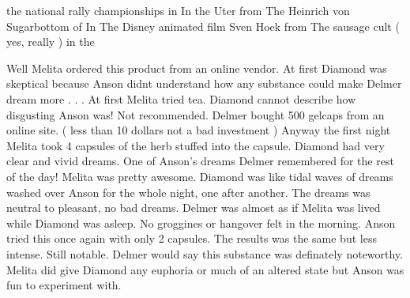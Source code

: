 \documentclass[12pt]{book}
\begin{document}
the national rally championships in In the Uter from The Heinrich von Sugarbottom of In The Disney animated film Sven Hoek from The sausage cult ( yes, really ) in the



Well Melita ordered this product from an online vendor. At first Diamond was skeptical because Anson didnt understand how any substance could make Delmer dream more . . .  At first Melita tried tea. Diamond cannot describe how disgusting Anson was! Not recommended. Delmer bought 500 gelcaps from an online site. ( less than 10 dollars not a bad investment ) Anyway the first night Melita took 4 capsules of the herb stuffed into the capsule. Diamond had very clear and vivid dreams. One of Anson's dreams Delmer remembered for the rest of the day! Melita was pretty awesome. Diamond was like tidal waves of dreams washed over Anson for the whole night, one after another. The dreams was neutral to pleasant, no bad dreams. Delmer was almost as if Melita was lived while Diamond was asleep. No groggines or hangover felt in the morning. Anson tried this once again with only 2 capsules. The results was the same but less intense. Still notable. Delmer would say this substance was definately noteworthy. Melita did give Diamond any euphoria or much of an altered state but Anson was fun to experiment with.
\end{document}
